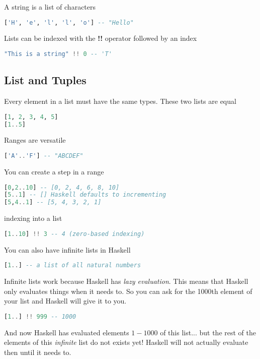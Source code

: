 A string is a list of characters
\begin{lstlisting}[language=Haskell]
['H', 'e', 'l', 'l', 'o'] -- "Hello"
\end{lstlisting}

Lists can be indexed with the \textbf{!!} operator followed by an index
\begin{lstlisting}[language=Haskell]
"This is a string" !! 0 -- 'T'
\end{lstlisting}

\subsection{List and Tuples}

Every element in a list must have the same types.
These two lists are equal
\begin{lstlisting}[language=Haskell]
[1, 2, 3, 4, 5]
[1..5]
\end{lstlisting}

Ranges are versatile
\begin{lstlisting}[language=Haskell]
['A'..'F'] -- "ABCDEF"
\end{lstlisting}

You can create a step in a range
\begin{lstlisting}[language=Haskell]
[0,2..10] -- [0, 2, 4, 6, 8, 10]
[5..1] -- [] Haskell defaults to incrementing
[5,4..1] -- [5, 4, 3, 2, 1]
\end{lstlisting}

indexing into a list
\begin{lstlisting}[language=Haskell]
[1..10] !! 3 -- 4 (zero-based indexing)
\end{lstlisting}

You can also have infinite lists in Haskell
\begin{lstlisting}[language=Haskell]
[1..] -- a list of all natural numbers
\end{lstlisting}

Infinite lists work because Haskell has \textit{lazy evaluation}. This means that
Haskell only evaluates things when it needs to. So you can ask for the 1000th element
of your list and Haskell will give it to you.

\begin{lstlisting}[language=Haskell]
[1..] !! 999 -- 1000
\end{lstlisting}

And now Haskell has evaluated elements $1 - 1000$ of this list... but the rest of the
elements of this \textit{infinite} list do not exists yet! Haskell will not
actually evaluate then until it needs to.

